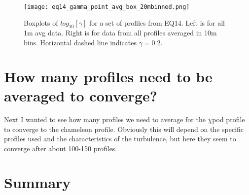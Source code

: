 \documentclass[11pt]{article}
\begin{document}
\begin{figure}[htbp]
\texttt{[image: eq14\_gamma\_point\_avg\_box\_20mbinned.png]}
\caption{Boxplots of $log_{10}[\gamma]$ for a set of profiles from EQ14. Left is for all 1m avg data. Right is for data from all profiles averaged in 10m bins. Horizontal dashed line indicates $\gamma=0.2$.}
\label{gambox_eq14}
\end{figure}


\clearpage
\section{How many profiles need to be averaged to converge?}

Next I wanted to see how many profiles we need to average for the $\chi$pod profile to converge to the chameleon profile. Obviously this will depend on the specific profiles used and the characteristics of the turbulence, but here they seem to converge after about 100-150 profiles. 


%
%






\clearpage
\section{Summary}

\end{document}
